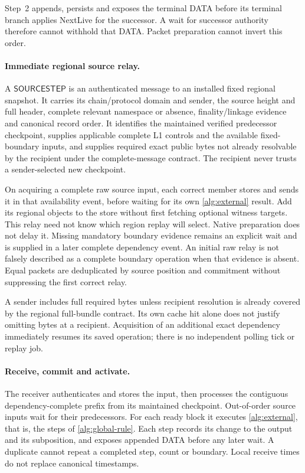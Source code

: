 \documentclass[11pt,a4paper]{article}
\newcommand{\tagg}[1]{\ensuremath{\mathsf{#1}}}
\newcounter{protocol}
\begin{document}
Step~2 appends, persists and exposes the terminal DATA before its
terminal branch applies NextLive for the successor. A wait for successor
authority therefore cannot withhold that DATA. Packet preparation cannot
invert this order.

\paragraph{Immediate regional source relay.}
A \tagg{SOURCESTEP} is an authenticated message to an installed fixed
regional snapshot. It carries its chain/protocol domain and sender,
the source height and full header, complete relevant namespace or
absence, finality/linkage evidence and canonical record order. It
identifies the maintained verified predecessor checkpoint, supplies
applicable complete L1 controls and the available fixed-boundary
inputs, and supplies required exact public bytes not already resolvable
by the recipient under the complete-message contract. The
recipient never trusts a sender-selected new checkpoint.

On acquiring a complete raw source input, each correct member stores
and sends it in that availability event, before waiting for its own
\cref{alg:external} result. Add its regional objects to the store
without first fetching optional witness targets. This relay
need not know which region replay will select. Native preparation does
not delay it. Missing mandatory boundary evidence remains an explicit
wait and is supplied in a later complete dependency event. An initial
raw relay is not falsely described as a complete boundary operation
when that evidence is absent. Equal packets are deduplicated by source
position and commitment without suppressing the first correct relay.

A sender includes full required bytes unless recipient resolution is
already covered by the regional full-bundle contract. Its own cache hit
alone does not justify omitting bytes at a recipient. Acquisition of an
additional exact dependency immediately resumes its saved operation;
there is no independent polling tick or replay job.

\paragraph{Receive, commit and activate.}
The receiver authenticates and stores the input, then processes the
contiguous dependency-complete prefix from its maintained checkpoint.
Out-of-order source inputs wait for their predecessors. For each ready
block it executes \cref{alg:external}, that is, the steps of
\cref{alg:global-rule}. Each step records its change to the output and
its subposition, and exposes appended DATA before any later wait. A
duplicate cannot repeat a completed step, count or boundary. Local
receive times do not replace canonical timestamps.
\end{document}
